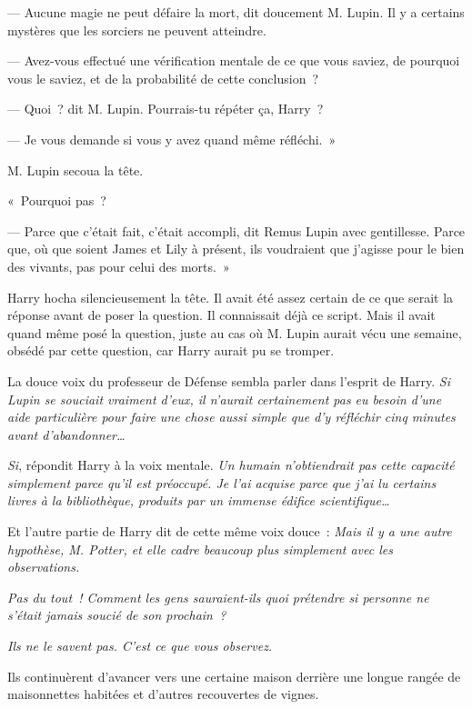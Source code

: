 --- Aucune magie ne peut défaire la mort, dit doucement M. Lupin. Il y a certains mystères que les sorciers ne peuvent atteindre.

--- Avez-vous effectué une vérification mentale de ce que vous saviez, de pourquoi vous le saviez, et de la probabilité de cette conclusion~?

--- Quoi~? dit M. Lupin. Pourrais-tu répéter ça, Harry~?

--- Je vous demande si vous y avez quand même réfléchi.~»

M. Lupin secoua la tête.

«~Pourquoi pas~?

--- Parce que c'était fait, c'était accompli, dit Remus Lupin avec gentillesse. Parce que, où que soient James et Lily à présent, ils voudraient que j'agisse pour le bien des vivants, pas pour celui des morts.~»

Harry hocha silencieusement la tête. Il avait été assez certain de ce que serait la réponse avant de poser la question. Il connaissait déjà ce script. Mais il avait quand même posé la question, juste au cas où M. Lupin aurait vécu une semaine, obsédé par cette question, car Harry aurait pu se tromper.

La douce voix du professeur de Défense sembla parler dans l'esprit de Harry. \emph{Si Lupin se souciait vraiment d'eux, il n'aurait certainement pas eu besoin d'une aide particulière pour faire une chose aussi simple que d'y réfléchir cinq minutes avant d'abandonner…}

\emph{Si}, répondit Harry à la voix mentale. \emph{Un humain n'obtiendrait pas cette capacité simplement parce qu'il est préoccupé. Je l'ai acquise parce que j'ai lu certains livres à la bibliothèque, produits par un immense édifice scientifique…}

Et l'autre partie de Harry dit de cette même voix douce~: \emph{Mais il y a une autre hypothèse, M. Potter, et elle cadre beaucoup plus simplement avec les observations.}

\emph{Pas du tout~! Comment les gens sauraient-ils quoi prétendre si personne ne s'était jamais soucié de son prochain~?}

\emph{Ils ne le savent pas. C'est ce que vous observez.}

Ils continuèrent d'avancer vers une certaine maison derrière une longue rangée de maisonnettes habitées et d'autres recouvertes de vignes.


